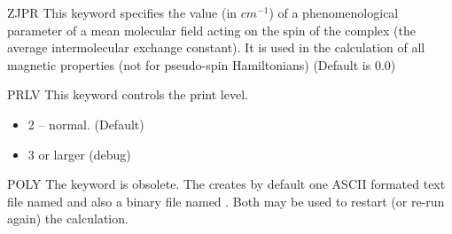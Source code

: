 \begin{keywordlist}
\item[ZJPR]
This keyword specifies the value (in $cm^{-1}$) of a phenomenological parameter of a mean
molecular field acting on the spin of the complex (the average intermolecular exchange
constant). It is used in the calculation of all magnetic properties (not for pseudo-spin
Hamiltonians) (Default is 0.0)






\item[PRLV]
This keyword controls the print level.
\begin{itemize}
 \item 2 -- normal. (Default)
 \item 3 or larger (debug)
\end{itemize}






\item[POLY]
The keyword is obsolete. The  creates by default one ASCII formated text file named 
and also a binary file named . Both may be used to restart (or re-run again) the  calculation.






\end{keywordlist}
